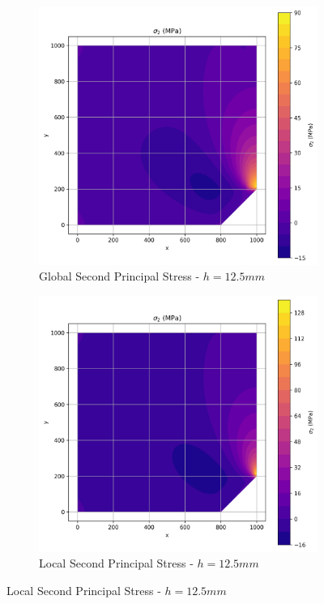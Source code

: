 \begin{figure}[H]
  \centering
  \begin{subfigure}[b]{0.45\textwidth}
    \centering
    \includegraphics[width=\textwidth]{GRAFICOS/Quad4/1.5mm_global/resultados - sigma_2.png}
    \caption{Global Second Principal Stress - $h=12.5mm$}
    \label{fig:img12}
  \end{subfigure}
  \hfill
  \begin{subfigure}[b]{0.45\textwidth}
    \centering
    \includegraphics[width=\textwidth]{GRAFICOS/Quad4/1.5mm_local/resultados - sigma_2.png}
    \caption{Local Second Principal Stress - $h=12.5mm$}
    \label{fig:img22}
  \end{subfigure}
\end{figure}

